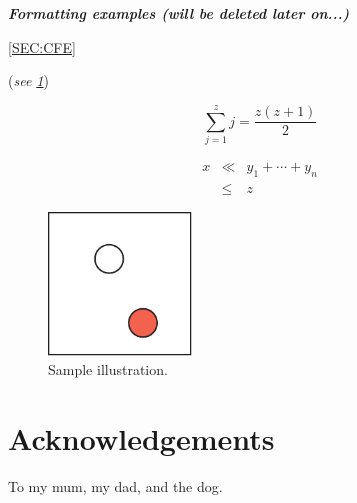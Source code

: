 \documentclass[conference]{acmsiggraph}
\begin{document}


\textit{\textbf{Formatting examples (will be deleted later on...)}}

\cref{SEC:CFE}\\

(\textit{see \cref{FIG:SAMPLE}})

\label{SEC:CFE}

\begin{equation}
 \sum_{j=1}^{z} j = \frac{z(z+1)}{2}
\end{equation}

\begin{eqnarray}
x & \ll & y_{1} + \cdots + y_{n} \\
  & \leq & z
\end{eqnarray}

\begin{figure}[ht]
  \centering
  \includegraphics[width=1.5in]{images/samplefigure}
  \caption{Sample illustration.}
  \label{FIG:SAMPLE}
\end{figure}

\section*{Acknowledgements}

To my mum, my dad, and the dog. 



\end{document}
